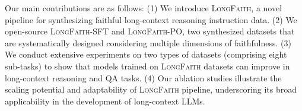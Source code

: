Our main contributions are as follows: (1) We introduce \textsc{LongFaith}, a novel pipeline for synthesizing faithful long-context reasoning instruction data. (2) We open-source \textsc{LongFaith}-SFT and \textsc{LongFaith}-PO, two synthesized datasets that are systematically designed considering multiple dimensions of faithfulness. (3) We conduct extensive experiments on two types of datasets (comprising eight sub-tasks) to show that models trained on \textsc{LongFaith} datasets can improve in long-context reasoning and QA tasks. (4) Our ablation studies illustrate the scaling potential and adaptability of \textsc{LongFaith} pipeline, underscoring its broad applicability in the development of long-context LLMs.